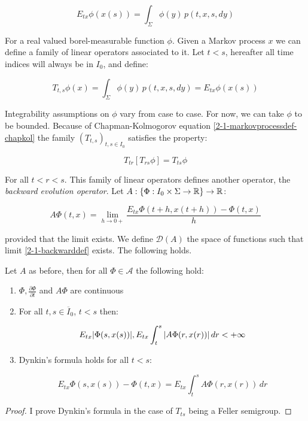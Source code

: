 \begin{equation}
    E_{tx}\phi(x(s)) = \int_{\Sigma} \phi(y)\,p(t,x,s,dy) 
\end{equation}

For a real valued borel-measurable function $\phi$. Given a Markov process $x$ we can define a family of 
linear operators associated to it. Let $t<s$, hereafter all time indices will always be in $I_0$, and define:

\begin{equation}
    T_{t,s}\phi(x) = \int_{\Sigma} \phi(y)\,p(t,x,s,dy) = E_{tx}\phi(x(s))
\end{equation}

Integrability assumptions on $\phi$ vary from case to case. For now, we can take $\phi$ to be bounded. 
Because of Chapman-Kolmogorov equation \ref{2-1-markovprocessdef-chapkol} the family $(T_{t,s})_{t,s\in I_0}$ 
satisfies the property:

\begin{equation}\label{2-1-propT}
    T_{tr}\left[T_{rs}\phi\right] = T_{ts}\phi
\end{equation}

For all $t<r<s$. This family of linear operators defines another operator, the \textit{backward evolution operator}.
Let $A:\left\{\Phi:I_0\times\Sigma\rightarrow\mathbb{R}\right\}\rightarrow \mathbb{R}$:

\begin{equation}\label{2-1-backwarddef}
    A\Phi(t,x) = \lim_{h\to0+} \frac{E_{tx}\Phi(t+h,x(t+h))-\Phi(t,x)}{h}
\end{equation}

provided that the limit exists. We define $\mathcal{D}(A)$ the space of functions such that limit \ref{2-1-backwarddef} exists. 
The following holds.

\begin{proposition}
    Let $A$ as before, then for all $\Phi\in\mathcal{A}$ the following hold:

    \begin{enumerate}
        \item $\Phi,\frac{\partial\Phi}{\partial t}$ and $A\Phi$ are continuous
        \item For all $t,s\in\overline{I}_0$, $t<s$ then:
        
        \[E_{tx}\abs{\Phi(s,x(s))},E_{tx}\int_t^s\abs{A\Phi(r,x(r))}\,dr < +\infty\]
        
        \item Dynkin's formula holds for all $t<s$:
        
        \begin{equation}\label{2-1-dynkform}
            E_{tx}\Phi(s,x(s)) - \Phi(t,x) = E_{tx}\int_t^s A\Phi(r,x(r)) \,dr
        \end{equation}
    \end{enumerate}

    \begin{proof}
        I prove Dynkin's formula in the case of $T_{ts}$ being a Feller semigroup. 

    \end{proof}
\end{proposition}

